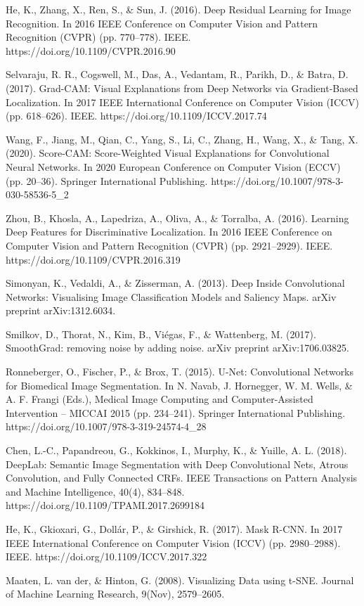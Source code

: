 \documentclass[10pt,a4paper,twocolumn,twoside]{article}
\begin{document}
\begin{thebibliography}{11}
He, K., Zhang, X., Ren, S., \& Sun, J. (2016). Deep Residual Learning for Image Recognition. In 2016 IEEE Conference on Computer Vision and Pattern Recognition (CVPR) (pp. 770–778). IEEE. https://doi.org/10.1109/CVPR.2016.90

Selvaraju, R. R., Cogswell, M., Das, A., Vedantam, R., Parikh, D., \& Batra, D. (2017). Grad-CAM: Visual Explanations from Deep Networks via Gradient-Based Localization. In 2017 IEEE International Conference on Computer Vision (ICCV) (pp. 618–626). IEEE. https://doi.org/10.1109/ICCV.2017.74

Wang, F., Jiang, M., Qian, C., Yang, S., Li, C., Zhang, H., Wang, X., \& Tang, X. (2020). Score-CAM: Score-Weighted Visual Explanations for Convolutional Neural Networks. In 2020 European Conference on Computer Vision (ECCV) (pp. 20–36). Springer International Publishing. https://doi.org/10.1007/978-3-030-58536-5\_2

Zhou, B., Khosla, A., Lapedriza, A., Oliva, A., \& Torralba, A. (2016). Learning Deep Features for Discriminative Localization. In 2016 IEEE Conference on Computer Vision and Pattern Recognition (CVPR) (pp. 2921–2929). IEEE. https://doi.org/10.1109/CVPR.2016.319

Simonyan, K., Vedaldi, A., \& Zisserman, A. (2013). Deep Inside Convolutional Networks: Visualising Image Classification Models and Saliency Maps. arXiv preprint arXiv:1312.6034.

Smilkov, D., Thorat, N., Kim, B., Viégas, F., \& Wattenberg, M. (2017). SmoothGrad: removing noise by adding noise. arXiv preprint arXiv:1706.03825.

Ronneberger, O., Fischer, P., \& Brox, T. (2015). U-Net: Convolutional Networks for Biomedical Image Segmentation. In N. Navab, J. Hornegger, W. M. Wells, \& A. F. Frangi (Eds.), Medical Image Computing and Computer-Assisted Intervention – MICCAI 2015 (pp. 234–241). Springer International Publishing. https://doi.org/10.1007/978-3-319-24574-4\_28

Chen, L.-C., Papandreou, G., Kokkinos, I., Murphy, K., \& Yuille, A. L. (2018). DeepLab: Semantic Image Segmentation with Deep Convolutional Nets, Atrous Convolution, and Fully Connected CRFs. IEEE Transactions on Pattern Analysis and Machine Intelligence, 40(4), 834–848. https://doi.org/10.1109/TPAMI.2017.2699184

He, K., Gkioxari, G., Dollár, P., \& Girshick, R. (2017). Mask R-CNN. In 2017 IEEE International Conference on Computer Vision (ICCV) (pp. 2980–2988). IEEE. https://doi.org/10.1109/ICCV.2017.322

Maaten, L. van der, \& Hinton, G. (2008). Visualizing Data using t-SNE. Journal of Machine Learning Research, 9(Nov), 2579–2605.

\end{thebibliography}
\end{document}

